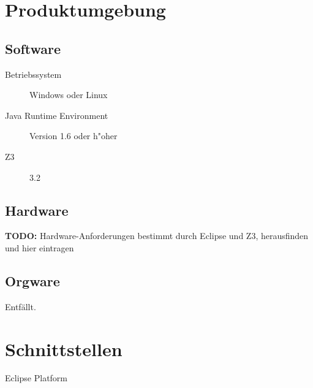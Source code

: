 \section{Produktumgebung}%

\subsection{Software}%

\begin{description}%
    \item [Betriebssystem] \see Windows oder \see Linux%
    \item [\see Java Runtime Environment] Version 1.6 oder h"oher%
    \item [\see Z3] 3.2%
\end{description}%

\subsection{Hardware}%

\textbf{TODO:} Hardware-Anforderungen bestimmt durch Eclipse und Z3, herausfinden und hier eintragen%

\subsection{\see Orgware}%

Entfällt.%

\section{Schnittstellen}%

\begin{description}%
    \item [\see Eclipse Platform]%
\end{description}%
